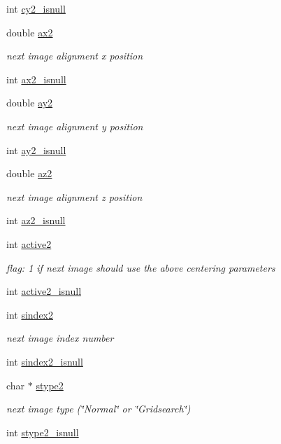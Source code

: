 \begin{DoxyCompactItemize}
int \hyperlink{structlspg__nextshot__struct_a57d78a389413827302df6ebe3dcb3c89}{cy2\-\_\-isnull}
\item 
double \hyperlink{structlspg__nextshot__struct_ab76bd38d2a098bc7eda82aff5dcb9c66}{ax2}
\begin{DoxyCompactList}\small\item\em next image alignment x position \end{DoxyCompactList}\item 
int \hyperlink{structlspg__nextshot__struct_a846845b0b9ecf6517ef85554771ec71d}{ax2\-\_\-isnull}
\item 
double \hyperlink{structlspg__nextshot__struct_ad13759740204b42e379161f98815f3d0}{ay2}
\begin{DoxyCompactList}\small\item\em next image alignment y position \end{DoxyCompactList}\item 
int \hyperlink{structlspg__nextshot__struct_ad0f50ec6339296d3d39c8d95131ab6b5}{ay2\-\_\-isnull}
\item 
double \hyperlink{structlspg__nextshot__struct_a94698a030fd5b2abf1f10a2ad33476a4}{az2}
\begin{DoxyCompactList}\small\item\em next image alignment z position \end{DoxyCompactList}\item 
int \hyperlink{structlspg__nextshot__struct_a95d080f13a4e02b9aa883821ee3e721c}{az2\-\_\-isnull}
\item 
int \hyperlink{structlspg__nextshot__struct_a2875aa18df587806a3d8c05220fd62b5}{active2}
\begin{DoxyCompactList}\small\item\em flag\-: 1 if next image should use the above centering parameters \end{DoxyCompactList}\item 
int \hyperlink{structlspg__nextshot__struct_a1aa11ff4a4c8d69695786b4349e84e6b}{active2\-\_\-isnull}
\item 
int \hyperlink{structlspg__nextshot__struct_ae9d0cfdff6868e0ba9cd5acafbe133db}{sindex2}
\begin{DoxyCompactList}\small\item\em next image index number \end{DoxyCompactList}\item 
int \hyperlink{structlspg__nextshot__struct_a28e0b5c32a2741ef22edeb9d35b04e4d}{sindex2\-\_\-isnull}
\item 
char $\ast$ \hyperlink{structlspg__nextshot__struct_ae08ef74ea76e6e099a3ff6c7f845d337}{stype2}
\begin{DoxyCompactList}\small\item\em next image type (\char`\"{}\-Normal\char`\"{} or \char`\"{}\-Gridsearch\char`\"{}) \end{DoxyCompactList}\item 
int \hyperlink{structlspg__nextshot__struct_a203e29ed0bb403aaab6d7f95f690cc0d}{stype2\-\_\-isnull}
\end{DoxyCompactItemize}


